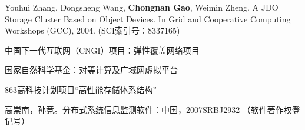 \begin{resume}
\begin{enumerate}[{[}1{]}]
  \item Youhui Zhang, Dongsheng Wang, \textbf{Chongnan Gao}, Weimin Zheng. A
  JDO Storage Cluster Based on Object Devices. In Grid and Cooperative
  Computing Workshops (GCC), 2004. (SCI索引号：8337165)

  \end{enumerate}

  \begin{enumerate}[{[}1{]}]

  \item 中国下一代互联网（CNGI）项目：弹性覆盖网络项目

  \item 国家自然科学基金：对等计算及广域网虚拟平台

  \item 863高科技计划项目“高性能存储体系结构”

  \end{enumerate}

  \begin{enumerate}[{[}1{]}]

  \item 高崇南，孙竞。分布式系统信息监测软件：中国，2007SRBJ2932
  （软件著作权登记号）

  \end{enumerate}
\end{resume}
